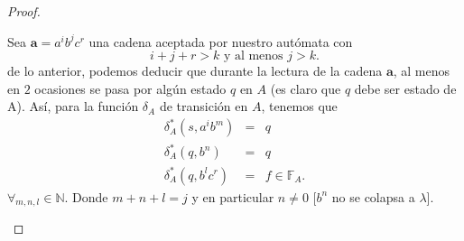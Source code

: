 \documentclass{article}
\begin{document}
\begin{enumerate}
\begin{proof}
\begin{itemize}
      Sea $\mathbf{a} = a^{i}b^{j}c^{r}$ una cadena aceptada por nuestro autómata con
      \[
      i + j + r > k \text{ y al menos } j > k.
      \]
      de lo anterior, podemos deducir que durante la lectura de la cadena $\mathbf{a}$, al
      menos en $2$ ocasiones se pasa por algún estado $q$ en $A$ (es claro que $q$ debe ser
      estado de A). Así, para la función $\delta_{A}$ de transición en $A$, tenemos que
      \begin{eqnarray*}
        \delta^{*}_{A}(s, a^{i}b^{m}) &=& q\\
        \delta^{*}_{A}(q, b^{n}) &=& q\\
        \delta^{*}_{A}(q, b^{l}c^{r}) &=& f \in \mathbb{F}_{A}.
      \end{eqnarray*}
      $\forall_{m,n,l} \in \mathbb{N}$. Donde $m + n + l = j$ y en particular $n \neq 0$ [$b^{n}$
        no se colapsa a $\lambda$].
      

\end{itemize}
\end{proof}
\end{enumerate}
\end{document}

